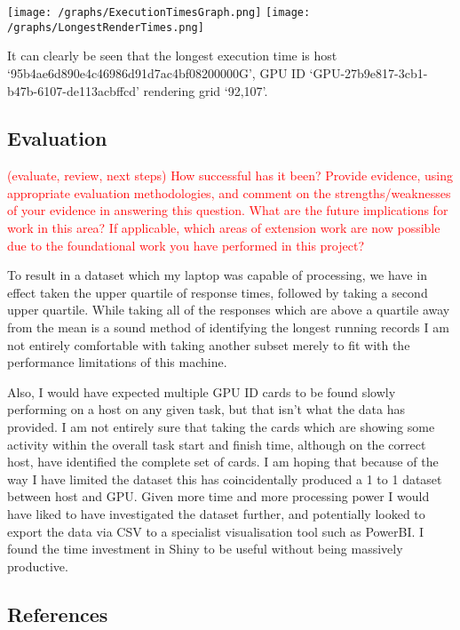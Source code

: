 \documentclass[
  twocolumn]{article}
\begin{document}
\texttt{[image: /graphs/ExecutionTimesGraph.png]}
\texttt{[image: /graphs/LongestRenderTimes.png]}

It can clearly be seen that the longest execution time is host
`95b4ae6d890e4c46986d91d7ac4bf08200000G', GPU ID
`GPU-27b9e817-3cb1-b47b-6107-de113acbffcd' rendering grid `92,107'.

\hypertarget{evaluation}{%
\subsection{Evaluation}\label{evaluation}}

\textcolor{red}{(evaluate, review, next steps)}
\textcolor{red}{How successful has it been? Provide evidence, using appropriate evaluation methodologies, and comment on the strengths/weaknesses of your evidence in answering this question. What are the future implications for work in this area? If applicable, which areas of extension work are now possible due to the foundational work you have performed in this project?}

To result in a dataset which my laptop was capable of processing, we
have in effect taken the upper quartile of response times, followed by
taking a second upper quartile. While taking all of the responses which
are above a quartile away from the mean is a sound method of identifying
the longest running records I am not entirely comfortable with taking
another subset merely to fit with the performance limitations of this
machine.

Also, I would have expected multiple GPU ID cards to be found slowly
performing on a host on any given task, but that isn't what the data has
provided. I am not entirely sure that taking the cards which are showing
some activity within the overall task start and finish time, although on
the correct host, have identified the complete set of cards. I am hoping
that because of the way I have limited the dataset this has
coincidentally produced a 1 to 1 dataset between host and GPU. Given
more time and more processing power I would have liked to have
investigated the dataset further, and potentially looked to export the
data via CSV to a specialist visualisation tool such as PowerBI. I found
the time investment in Shiny to be useful without being massively
productive.

\hypertarget{references}{%
\subsection{References}\label{references}}
\end{document}
